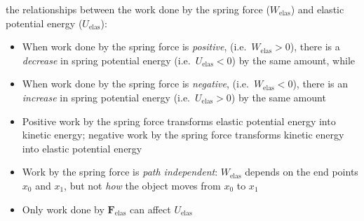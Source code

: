 the relationships between the work done by the spring force ($W_\text{elas}$)
and elastic potential energy ($U_\text{elas}$):
\begin{definition}
  \begin{itemize}[itemsep=6pt]
  \item When work done by the spring force is \emph{positive}, (i.e.\
    $W_\text{elas}>0$), there is a \emph{decrease} in spring potential energy
    (i.e.\ $U_\text{elas}<0$) by the same amount, while
  \item When work done by the spring force is \emph{negative}, (i.e.\
    $W_\text{elas}<0$), there is an \emph{increase} in spring potential energy
    (i.e.\ $U_\text{elas}>0$) by the same amount
  \item Positive work by the spring force transforms elastic potential energy
    into kinetic energy; negative work by the spring force transforms kinetic
    energy into elastic potential energy
  \item Work by the spring force is \emph{path independent}: $W_\text{elas}$
    depends on the end points $x_0$ and $x_1$, but not \emph{how} the object
    moves from $x_0$ to $x_1$
  \item Only work done by $\bm F_\text{elas}$ can affect $U_\text{elas}$
  \end{itemize}
\end{definition}


